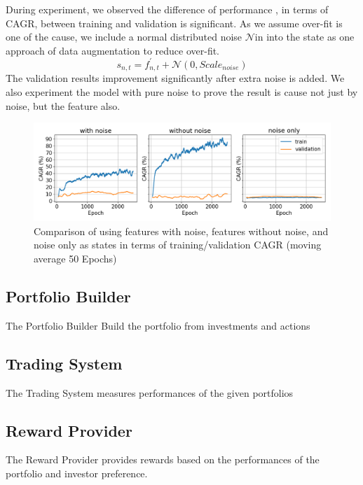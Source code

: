 During experiment, we observed the difference of performance , in terms of CAGR, between training and validation is significant. As we assume over-fit is one of the cause, we include a normal distributed noise \(\mathcal{N}\)in into the state as one approach of data augmentation to reduce over-fit.
\[
    s_{n,t} = f^{'}_{n,t} + \mathcal{N}(0,Scale_{noise})
\]
The validation results improvement significantly after extra noise is added.
We also experiment the model with pure noise to prove the result is cause not just by noise, but the feature also.
\begin{figure}[ht]
  \includegraphics[width=15cm]{images/compare_noise.png}
  \caption{Comparison of using features with noise, features without noise, and noise only as states in terms of training/validation CAGR (moving average 50 Epochs)}
  \label{fig:noise_diagram}
\end{figure}

\subsection {Portfolio Builder}
The Portfolio Builder Build the portfolio from investments and actions
\subsection {Trading System}
The Trading System measures performances of the given portfolios
\subsection {Reward Provider}
The Reward Provider provides rewards based on the performances of the portfolio and investor preference.